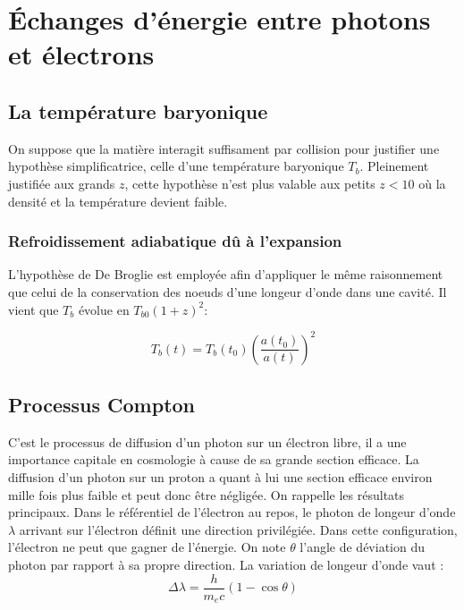 \documentclass[10pt, a4paper]{report}
\numberwithin{equation}{subsection}
\begin{document}
\chapter{\uppercase{é}changes d'énergie entre photons et électrons}
\section{La température baryonique}
On suppose que la matière interagit suffisament par collision pour justifier une hypothèse simplificatrice, celle d'une température baryonique $T_b$. Pleinement justifiée aux grands $z$, cette hypothèse n'est plus valable aux petits $z < 10$ où la densité et la température devient faible.
\subsection{Refroidissement adiabatique dû à l'expansion}
L'hypothèse de De Broglie est employée afin d'appliquer le même raisonnement que celui de la conservation des noeuds d'une longeur d'onde dans une cavité. Il vient que $T_b$ évolue en $T_{b0} (1+z)^2$:

\begin{equation} \label{eq:RTB}
\boxed{T_b(t) = T_b(t_0) \left(\frac{a(t_0)}{a(t)}\right)^2}
\end{equation}

\section{Processus Compton}
C'est le processus de diffusion d'un photon sur un électron libre, il a une importance capitale en cosmologie à cause de sa grande section efficace. La diffusion d'un photon sur un proton a quant à lui une section efficace environ mille fois plus faible et peut donc être négligée. On rappelle les résultats principaux. Dans le référentiel de l'électron au repos, le photon de longeur d'onde $\lambda$ arrivant sur l'électron définit une direction privilégiée. Dans cette configuration, l'électron ne peut que gagner de l'énergie. On note $\theta$ l'angle de déviation du photon par rapport à sa propre direction.
La variation de longeur d'onde vaut :
\begin{equation} \label{eq:VLO}
\boxed{\Delta\lambda=\frac{h}{m_e c}(1 - \cos \theta)}
\end{equation}
\end{document}
